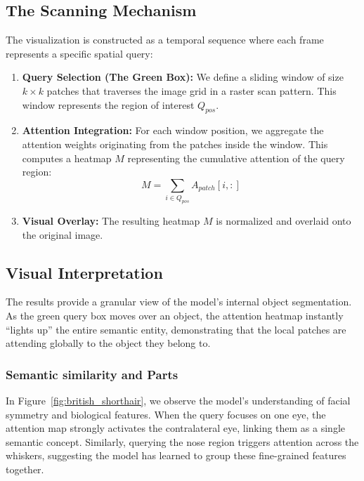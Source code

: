 \documentclass[oneside]{ctuthesis}
\begin{document}
\subsection{The Scanning Mechanism}
The visualization is constructed as a temporal sequence where each frame represents a specific spatial query:
\begin{enumerate}
    \item \textbf{Query Selection (The Green Box):} We define a sliding window of size $k \times k$ patches that traverses the image grid in a raster scan pattern. This window represents the region of interest $Q_{pos}$.
    \item \textbf{Attention Integration:} For each window position, we aggregate the attention weights originating from the patches inside the window. This computes a heatmap $M$ representing the cumulative attention of the query region:
    \begin{equation}
        M = \sum_{i \in Q_{pos}} A_{patch}[i, :]
    \end{equation}
    \item \textbf{Visual Overlay:} The resulting heatmap $M$ is normalized and overlaid onto the original image.
\end{enumerate}

\subsection{Visual Interpretation}
The results provide a granular view of the model's internal object segmentation. As the green query box moves over an object, the attention heatmap instantly ``lights up'' the entire semantic entity, demonstrating that the local patches are attending globally to the object they belong to.

\subsubsection{Semantic similarity and Parts}
In Figure~\ref{fig:british_shorthair}, we observe the model's understanding of facial symmetry and biological features. When the query focuses on one eye, the attention map strongly activates the contralateral eye, linking them as a single semantic concept. Similarly, querying the nose region triggers attention across the whiskers, suggesting the model has learned to group these fine-grained features together.
\end{document}
